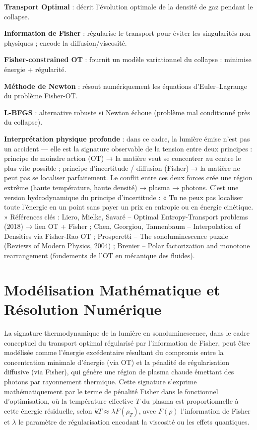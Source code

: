 \documentclass[a4paper,12pt]{article}
\begin{document}
\item \textbf{Transport Optimal} : décrit l’évolution optimale de la densité de gaz pendant le collapse.
    \item \textbf{Information de Fisher} : régularise le transport pour éviter les singularités non physiques ; encode la diffusion/viscosité.
    \item \textbf{Fisher-constrained OT} : fournit un modèle variationnel du collapse : minimise énergie + régularité.
    \item \textbf{Méthode de Newton} : résout numériquement les équations d’Euler–Lagrange du problème Fisher-OT.
    \item \textbf{L-BFGS} : alternative robuste si Newton échoue (problème mal conditionné près du collapse).
    \item \textbf{Interprétation physique profonde} : dans ce cadre, la lumière émise n’est pas un accident — elle est la signature observable de la tension entre deux principes : principe de moindre action (OT) → la matière veut se concentrer au centre le plus vite possible ; principe d’incertitude / diffusion (Fisher) → la matière ne peut pas se localiser parfaitement. Le conflit entre ces deux forces crée une région extrême (haute température, haute densité) → plasma → photons. C’est une version hydrodynamique du principe d’incertitude : « Tu ne peux pas localiser toute l’énergie en un point sans payer un prix en entropie ou en énergie cinétique. »
Références clés : Liero, Mielke, Savaré – Optimal Entropy-Transport problems (2018) → lien OT + Fisher ; Chen, Georgiou, Tannenbaum – Interpolation of Densities via Fisher-Rao OT ; Prosperetti – The sonoluminescence puzzle (Reviews of Modern Physics, 2004) ; Brenier – Polar factorization and monotone rearrangement (fondements de l’OT en mécanique des fluides). 
\newpage
\section{Modélisation Mathématique et Résolution Numérique}
La signature thermodynamique de la lumière en sonoluminescence, dans le cadre conceptuel du transport optimal régularisé par l'information de Fisher, peut être modélisée comme l'énergie excédentaire résultant du compromis entre la concentration minimale d'énergie (via OT) et la pénalité de régularisation diffusive (via Fisher), qui génère une région de plasma chaude émettant des photons par rayonnement thermique. Cette signature s'exprime mathématiquement par le terme de pénalité Fisher dans le fonctionnel d'optimisation, où la température effective \( T \) du plasma est proportionnelle à cette énergie résiduelle, selon \( k T \approx \lambda F(\rho_T) \), avec \( F(\rho) \) l'information de Fisher et \( \lambda \) le paramètre de régularisation encodant la viscosité ou les effets quantiques.
\end{document}
